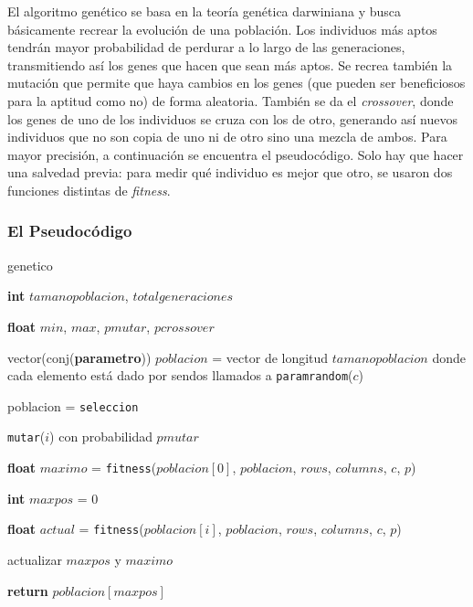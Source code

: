 \documentclass[A4paper,oneside,fleqn,11pt]{article}
\theoremstyle{definition}
\begin{document}
El algoritmo genético se basa en la teoría genética darwiniana y busca básicamente recrear la evolución de una población. Los individuos más aptos tendrán mayor probabilidad de perdurar a lo largo de las generaciones, transmitiendo así los genes que hacen que sean más aptos. Se recrea también la mutación que permite que haya cambios en los genes (que pueden ser beneficiosos para la aptitud como no) de forma aleatoria. También se da el \textit{crossover}, donde los genes de uno de los individuos se cruza con los de otro, generando así nuevos individuos que no son copia de uno ni de otro sino una mezcla de ambos. Para mayor precisión, a continuación se encuentra el pseudocódigo. Solo hay que hacer una salvedad previa: para medir qué individuo es mejor que otro, se usaron dos funciones distintas de \textit{fitness}.

\subsubsection{El Pseudocódigo}
\begin{algorithm}


 


\caption{genetico}

	\textbf{int} $tamanopoblacion$, $totalgeneraciones$

	\textbf{float} $min$, $max$, $pmutar$, $pcrossover$

	vector(conj(\textbf{parametro})) $poblacion$ = vector de longitud $tamanopoblacion$ donde cada elemento está dado por sendos llamados a \texttt{paramrandom}($c$)

	\For{$generacion = [1..totalgeneraciones$)}
		{

		poblacion = \texttt{seleccion}

			{
			\texttt{mutar}($i$) con probabilidad $pmutar$
			}
		}

	\textbf{float} $maximo$ = \texttt{fitness}($poblacion[0]$, $poblacion$, $rows$, $columns$, $c$, $p$)

	\textbf{int} $maxpos$ = 0

	\For{\textbf{int} $i$ = [1..$poblacion$)}
		{

		\textbf{float} $actual$ = \texttt{fitness}($poblacion[i]$, $poblacion$, $rows$, $columns$, $c$, $p$)

			{

			actualizar $maxpos$ y $maximo$
			}
		}

	\textbf{return} $poblacion[maxpos]$

\end{algorithm}
\end{document}
